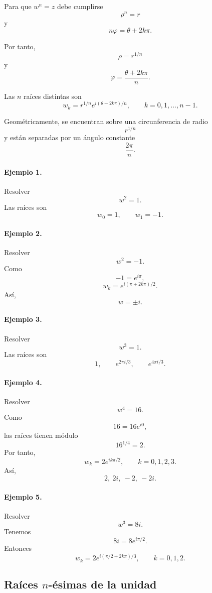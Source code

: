 Para que $w^n=z$ debe cumplirse
\[
\rho^n=r
\]
y
\[
n\varphi
=
\theta+2k\pi.
\]

Por tanto,
\[
\rho=r^{1/n}
\]
y
\[
\varphi
=
\frac{\theta+2k\pi}{n}.
\]

Las $n$ raíces distintas son
\[
\boxed{
w_k
=
r^{1/n}
e^{i(\theta+2k\pi)/n},
\qquad
k=0,1,\ldots,n-1.
}
\]

Geométricamente, se encuentran sobre una circunferencia de radio
\[
r^{1/n}
\]
y están separadas por un ángulo constante
\[
\frac{2\pi}{n}.
\]

\paragraph{Ejemplo 1.}
Resolver
\[
w^2=1.
\]
Las raíces son
\[
w_0=1,
\qquad
w_1=-1.
\]

\paragraph{Ejemplo 2.}
Resolver
\[
w^2=-1.
\]
Como
\[
-1=e^{i\pi},
\]
\[
w_k
=
e^{i(\pi+2k\pi)/2}.
\]
Así,
\[
\boxed{w=\pm i}.
\]

\paragraph{Ejemplo 3.}
Resolver
\[
w^3=1.
\]
Las raíces son
\[
1,
\qquad
e^{2\pi i/3},
\qquad
e^{4\pi i/3}.
\]

\paragraph{Ejemplo 4.}
Resolver
\[
w^4=16.
\]
Como
\[
16=16e^{i0},
\]
las raíces tienen módulo
\[
16^{1/4}=2.
\]
Por tanto,
\[
w_k
=
2e^{ik\pi/2},
\qquad k=0,1,2,3.
\]
Así,
\[
\boxed{2,\ 2i,\ -2,\ -2i}.
\]

\paragraph{Ejemplo 5.}
Resolver
\[
w^3=8i.
\]
Tenemos
\[
8i=8e^{i\pi/2}.
\]
Entonces
\[
w_k
=
2e^{i(\pi/2+2k\pi)/3},
\qquad k=0,1,2.
\]

\subsection{Raíces $n$-ésimas de la unidad}

